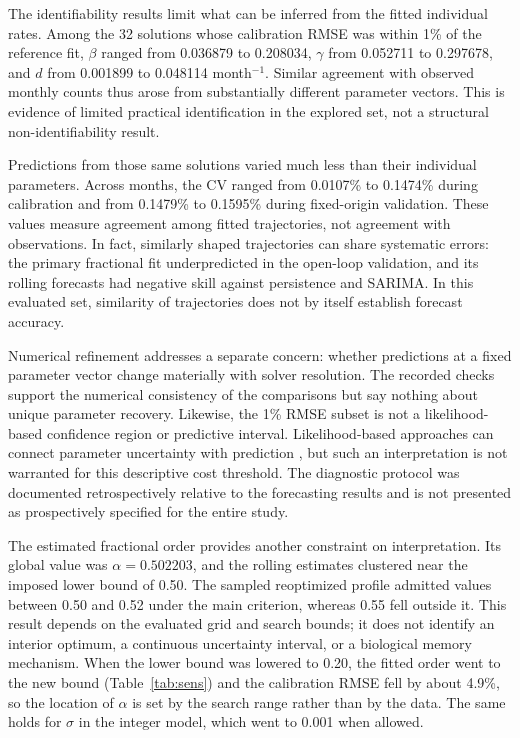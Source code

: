 \documentclass[pdflatex,sn-mathphys-ay]{sn-jnl}
\begin{document}
The identifiability results limit what can be inferred from the fitted individual rates. Among the 32 solutions whose calibration RMSE was within 1\% of the reference fit, $\beta$ ranged from 0.036879 to 0.208034, $\gamma$ from 0.052711 to 0.297678, and $d$ from 0.001899 to 0.048114 month$^{-1}$. Similar agreement with observed monthly counts thus arose from substantially different parameter vectors. This is evidence of limited practical identification in the explored set, not a structural non-identifiability result.

Predictions from those same solutions varied much less than their individual parameters. Across months, the CV ranged from 0.0107\% to 0.1474\% during calibration and from 0.1479\% to 0.1595\% during fixed-origin validation. These values measure agreement among fitted trajectories, not agreement with observations. In fact, similarly shaped trajectories can share systematic errors: the primary fractional fit underpredicted in the open-loop validation, and its rolling forecasts had negative skill against persistence and SARIMA. In this evaluated set, similarity of trajectories does not by itself establish forecast accuracy.

Numerical refinement addresses a separate concern: whether predictions at a fixed parameter vector change materially with solver resolution. The recorded checks support the numerical consistency of the comparisons but say nothing about unique parameter recovery. Likewise, the 1\% RMSE subset is not a likelihood-based confidence region or predictive interval. Likelihood-based approaches can connect parameter uncertainty with prediction \citep{simpson2024}, but such an interpretation is not warranted for this descriptive cost threshold. The diagnostic protocol was documented retrospectively relative to the forecasting results and is not presented as prospectively specified for the entire study.

The estimated fractional order provides another constraint on interpretation. Its global value was $\alpha=0.502203$, and the rolling estimates clustered near the imposed lower bound of 0.50. The sampled reoptimized profile admitted values between 0.50 and 0.52 under the main criterion, whereas 0.55 fell outside it. This result depends on the evaluated grid and search bounds; it does not identify an interior optimum, a continuous uncertainty interval, or a biological memory mechanism. When the lower bound was lowered to 0.20, the fitted order went to the new bound (Table~\ref{tab:sens}) and the calibration RMSE fell by about 4.9\%, so the location of $\alpha$ is set by the search range rather than by the data. The same holds for $\sigma$ in the integer model, which went to 0.001 when allowed.
\end{document}
